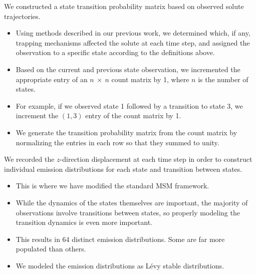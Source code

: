 \documentclass{article}
\begin{document}
  
  \noindent We constructed a state transition probability matrix based on observed solute
  trajectories.
  \begin{itemize}
    \item Using methods described in our previous work, we determined 	
    which, if any, trapping mechanisms affected the solute at each time step, and
    assigned the observation to a specific state according to the definitions 
    above.~\cite{coscia_chemically_2019}
    \item Based on the current and previous state observation, we incremented the
    appropriate entry of an $n~\times~n$ count matrix by 1, where $n$ is the number of states.
    \item For example, if we observed state 1 followed by a transition to state 3,
    we increment the $(1, 3)$ entry of the count matrix by 1.
    \item We generate the transition probability matrix from the count matrix by 
    normalizing the entries in each row so that they summed to unity.
  \end{itemize}
  
  \noindent We recorded the $z$-direction displacement at each time step in order to construct
  individual emission distributions for each state and transition between states.
  \begin{itemize}
    \item This is where we have modified the standard MSM framework.
    \item While the dynamics of the states themselves are important, the 
    majority of observations involve transitions between states, so properly modeling
    the transition dynamics is even more important.
    \item This results in 64 distinct emission distributions. Some are far more
    populated than others. %
    \item We modeled the emission distributions as L\'evy stable distributions. 
  \end{itemize}
\end{document}
